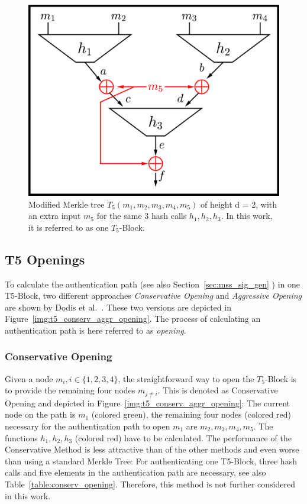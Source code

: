\begin{figure}
\centering
\includegraphics[]{images/Methods/abcd_paperT5_block_depiction.png}
\caption{Modified Merkle tree $T_5(m_1, m_2, m_3, m_4, m_5)$ of height d = 2,   with an extra input $m_5$ for the same 3 hash calls $h_1, h_2, h_3$. In this work, it is referred to as one $T_5$-Block.~\cite{T5_paper}}
\label{img:t5_paper_block_depiction}
\end{figure}

\subsection{T5 Openings}
To calculate the authentication path (see also Section~\ref{sec:mss_sig_gen} ) in one T5-Block, two different approaches \textit{Conservative Opening} and \textit{Aggressive Opening} are shown by Dodis et al.~\cite{T5_paper}. These two versions are depicted in Figure~\ref{img:t5_conserv_aggr_opening}.
The process of calculating an authentication path is here referred to as \textit{opening}. 

\subsubsection{Conservative Opening}
\label{sec:conserv_opening}
Given a node $m_i, i \in \{1,2,3,4\}$, the straightforward way to open the $T_5$-Block is to provide the remaining four nodes $m_{j \neq i}$. This is denoted as Conservative Opening and depicted in Figure~\ref{img:t5_conserv_aggr_opening}: The current node on the path is $m_1$ (colored green), the remaining four nodes (colored red) necessary for the authentication path to open $m_1$ are $m_2, m_3, m_4, m_5$. The functions $h_1, h_2, h_3$ (colored red) have to be calculated. The performance of the Conservative Method is less attractive than of the other methods and even worse than using a standard Merkle Tree: For authenticating one T5-Block, three hash calls and five elements in the authentication path are necessary, see also Table~\ref{table:conserv_opening}. Therefore, this method is not further considered in this work. %


